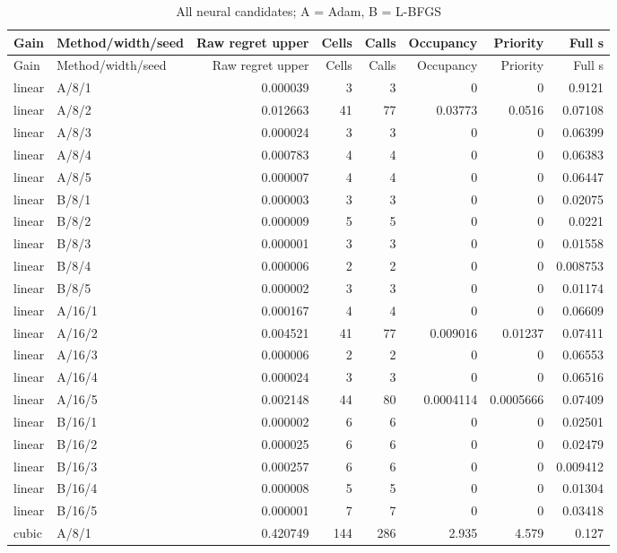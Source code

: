 \begingroup\footnotesize\setlength{\tabcolsep}{3pt}
\begin{longtable}{llrrrrrr}\caption{All neural candidates; A = Adam, B = L-BFGS}\\\toprule
Gain & Method/width/seed & Raw regret upper & Cells & Calls & Occupancy & Priority & Full s \\\midrule\endfirsthead
\toprule Gain & Method/width/seed & Raw regret upper & Cells & Calls & Occupancy & Priority & Full s \\\midrule\endhead
\bottomrule\endfoot
linear & A/8/1 & 0.000039 & 3 & 3 & 0 & 0 & 0.9121 \\
linear & A/8/2 & 0.012663 & 41 & 77 & 0.03773 & 0.0516 & 0.07108 \\
linear & A/8/3 & 0.000024 & 3 & 3 & 0 & 0 & 0.06399 \\
linear & A/8/4 & 0.000783 & 4 & 4 & 0 & 0 & 0.06383 \\
linear & A/8/5 & 0.000007 & 4 & 4 & 0 & 0 & 0.06447 \\
linear & B/8/1 & 0.000003 & 3 & 3 & 0 & 0 & 0.02075 \\
linear & B/8/2 & 0.000009 & 5 & 5 & 0 & 0 & 0.0221 \\
linear & B/8/3 & 0.000001 & 3 & 3 & 0 & 0 & 0.01558 \\
linear & B/8/4 & 0.000006 & 2 & 2 & 0 & 0 & 0.008753 \\
linear & B/8/5 & 0.000002 & 3 & 3 & 0 & 0 & 0.01174 \\
linear & A/16/1 & 0.000167 & 4 & 4 & 0 & 0 & 0.06609 \\
linear & A/16/2 & 0.004521 & 41 & 77 & 0.009016 & 0.01237 & 0.07411 \\
linear & A/16/3 & 0.000006 & 2 & 2 & 0 & 0 & 0.06553 \\
linear & A/16/4 & 0.000024 & 3 & 3 & 0 & 0 & 0.06516 \\
linear & A/16/5 & 0.002148 & 44 & 80 & 0.0004114 & 0.0005666 & 0.07409 \\
linear & B/16/1 & 0.000002 & 6 & 6 & 0 & 0 & 0.02501 \\
linear & B/16/2 & 0.000025 & 6 & 6 & 0 & 0 & 0.02479 \\
linear & B/16/3 & 0.000257 & 6 & 6 & 0 & 0 & 0.009412 \\
linear & B/16/4 & 0.000008 & 5 & 5 & 0 & 0 & 0.01304 \\
linear & B/16/5 & 0.000001 & 7 & 7 & 0 & 0 & 0.03418 \\
cubic & A/8/1 & 0.420749 & 144 & 286 & 2.935 & 4.579 & 0.127 \\

\end{longtable}

